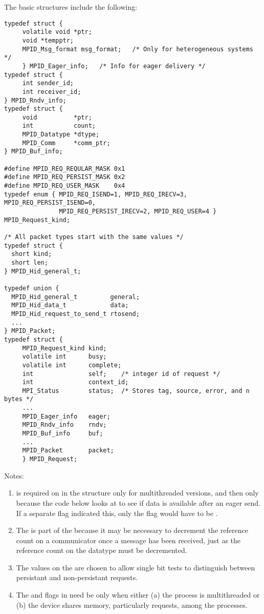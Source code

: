 The basic structures include the following:
\begin{verbatim}
typedef struct { 
     volatile void *ptr;
     void *tempptr;
     MPID_Msg_format msg_format;   /* Only for heterogeneous systems */
     } MPID_Eager_info;   /* Info for eager delivery */
typedef struct { 
     int sender_id;
     int receiver_id;
} MPID_Rndv_info;
typedef struct {
     void          *ptr;
     int           count;
     MPID_Datatype *dtype;
     MPID_Comm     *comm_ptr;
} MPID_Buf_info;

#define MPID_REQ_REQULAR_MASK 0x1
#define MPID_REQ_PERSIST_MASK 0x2
#define MPID_REQ_USER_MASK    0x4
typedef enum { MPID_REQ_ISEND=1, MPID_REQ_IRECV=3, MPID_REQ_PERSIST_ISEND=0,
               MPID_REQ_PERSIST_IRECV=2, MPID_REQ_USER=4 } MPID_Request_kind;

/* All packet types start with the same values */
typedef struct {
  short kind;
  short len;
} MPID_Hid_general_t;

typedef union {
  MPID_Hid_general_t         general;
  MPID_Hid_data_t            data;
  MPID_Hid_request_to_send_t rtosend;
  ...
} MPID_Packet;
typedef struct {
     MPID_Request_kind kind;
     volatile int      busy;
     volatile int      complete;
     int               self;    /* integer id of request */
     int               context_id;
     MPI_Status        status;  /* Stores tag, source, error, and n bytes */
     ...
     MPID_Eager_info   eager;
     MPID_Rndv_info    rndv;
     MPID_Buf_info     buf;
     ...
     MPID_Packet       packet;
     } MPID_Request;
\end{verbatim}

Notes:
\begin{enumerate}
\item {} is required on  in the 
  structure only for multithreaded versions, and then only because the code
  below looks at  to see if data is available after an eager send.
  If a separate flag indicated this, only the flag would have to be
  . 

\item The  is part of the  because it may
  be necessary to decrement the reference count on a communicator once a
  message has been received, just as the reference count on the datatype must
  be decremented.  

\item The values on the  are chosen to allow single
  bit tests to distinguish between persistant and non-persistant requests.

\item The  and  flags in  need be
   only when either (a) the process is multithreaded or (b) the
  device shares memory, particularly requests, among the processes.
\end{enumerate}

